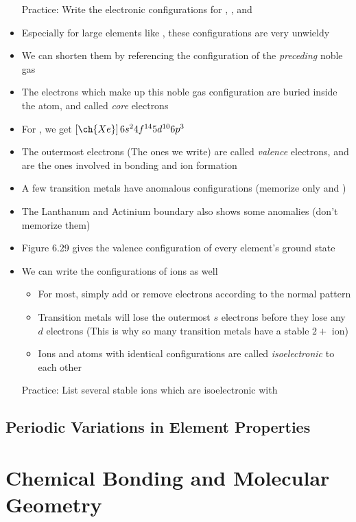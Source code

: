 \documentclass[12pt, openany, letterpaper]{memoir}
\begin{document}
\begin{itemize}
	      Practice: Write the electronic configurations for , , and 
	\item Especially for large elements like , these configurations are very unwieldy
	\item We can shorten them by referencing the configuration of the \emph{preceding} noble gas
	\item The electrons which make up this noble gas configuration are buried inside the atom, and called \emph{core} electrons
	\item For , we get $\left[\ch{Xe}\right]6s^24f^{14}5d^{10}6p^3$
	\item The outermost electrons (The ones we write) are called \emph{valence} electrons, and are the ones involved in bonding and ion formation
	\item A few transition metals have anomalous configurations (memorize only  and )
	\item The Lanthanum and Actinium boundary also shows some anomalies (don't memorize them) 
  \item Figure 6.29 gives the valence configuration of every element's ground state
	\item We can write the configurations of ions as well
	      \begin{itemize}
		      \item For most, simply add or remove electrons according to the normal pattern
		      \item Transition metals will lose the outermost $s$ electrons before they lose any $d$ electrons (This is why so many transition metals have a stable $2+$ ion)
		      \item Ions and atoms with identical configurations are called \emph{isoelectronic} to each other
	      \end{itemize}
	      Practice: List several stable ions which are isoelectronic with 
\end{itemize}

\section{Periodic Variations in Element Properties}

\chapter{Chemical Bonding and Molecular Geometry}
\end{document}
